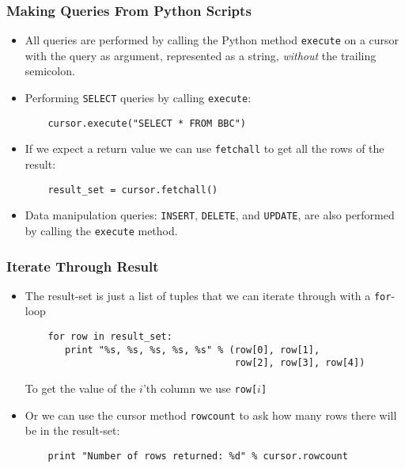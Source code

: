 \documentclass[dvipsnames]{beamer}
\begin{document}
\begin{frame}[fragile=singleslide]
\frametitle{Making Queries From Python Scripts}

\begin{itemize}

\item All queries are performed by calling the Python method
  \texttt{execute} on a cursor with the \sql{} query as
    argument, represented as a string, \emph{without} the trailing
    semicolon.
 
  
  \item Performing \texttt{SELECT} queries by calling
    \texttt{execute}:
    \begin{small}
\begin{verbatim}
    cursor.execute("SELECT * FROM BBC")
\end{verbatim}
    \end{small}


  \item If we expect a return value we can use \texttt{fetchall} to
    get all the rows of the result:
    \begin{small}
\begin{verbatim}
    result_set = cursor.fetchall()
\end{verbatim}
    \end{small}

  \item Data manipulation queries: \texttt{INSERT}, \texttt{DELETE},
    and \texttt{UPDATE}, are also performed by calling the
    \texttt{execute} method.
  \end{itemize}
\end{frame}



\begin{frame}[fragile]
  \frametitle{Iterate Through Result}
  \begin{itemize}
  \item The result-set is just a list of tuples that we can iterate
    through with a \texttt{for}-loop
    \begin{small}
\begin{verbatim}
    for row in result_set:
       print "%s, %s, %s, %s, %s" % (row[0], row[1], 
                                     row[2], row[3], row[4])
\end{verbatim}
    \end{small}
    To get the value of the $i$'th column we use \texttt{row[$i$]}
  

  \item Or we can use the cursor method \texttt{rowcount} to ask how
    many rows there will be in the result-set:
    \begin{small}
\begin{verbatim}
    print "Number of rows returned: %d" % cursor.rowcount
\end{verbatim}
    \end{small}
  \end{itemize}
\end{frame}
\end{document}
